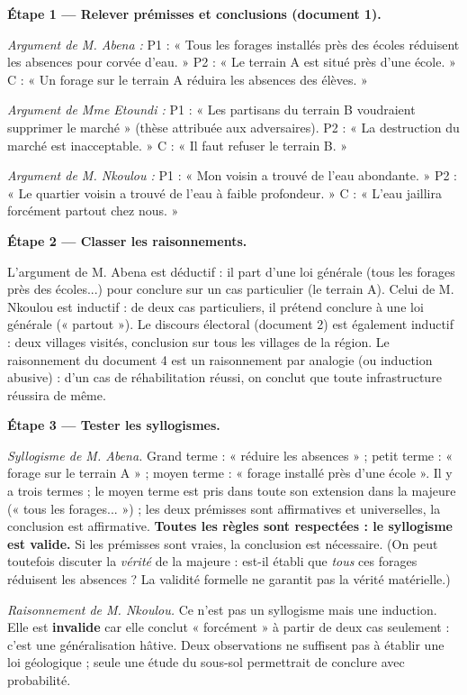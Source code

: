 \documentclass[11pt]{article}
\newcommand{\cle}[1]{{\popxbold\color{popdark}#1}}
\begin{document}
\begin{exoresolu}
\textbf{Étape 1 — Relever prémisses et conclusions (document 1).}

\emph{Argument de M. Abena :} P1 : « Tous les forages installés près des écoles réduisent les absences pour corvée d'eau. » P2 : « Le terrain A est situé près d'une école. » C : « Un forage sur le terrain A réduira les absences des élèves. »

\emph{Argument de Mme Etoundi :} P1 : « Les partisans du terrain B voudraient supprimer le marché » (thèse attribuée aux adversaires). P2 : « La destruction du marché est inacceptable. » C : « Il faut refuser le terrain B. »

\emph{Argument de M. Nkoulou :} P1 : « Mon voisin a trouvé de l'eau abondante. » P2 : « Le quartier voisin a trouvé de l'eau à faible profondeur. » C : « L'eau jaillira forcément partout chez nous. »

\tcblower

\textbf{Étape 2 — Classer les raisonnements.}

L'argument de M. Abena est \cle{déductif} : il part d'une loi générale (tous les forages près des écoles...) pour conclure sur un cas particulier (le terrain A). Celui de M. Nkoulou est \cle{inductif} : de deux cas particuliers, il prétend conclure à une loi générale (« partout »). Le discours électoral (document 2) est également inductif : deux villages visités, conclusion sur tous les villages de la région. Le raisonnement du document 4 est un raisonnement par \cle{analogie} (ou induction abusive) : d'un cas de réhabilitation réussi, on conclut que toute infrastructure réussira de même.

\textbf{Étape 3 — Tester les syllogismes.}

\emph{Syllogisme de M. Abena.} Grand terme : « réduire les absences » ; petit terme : « forage sur le terrain A » ; moyen terme : « forage installé près d'une école ». Il y a trois termes ; le moyen terme est pris dans toute son extension dans la majeure (« tous les forages... ») ; les deux prémisses sont affirmatives et universelles, la conclusion est affirmative. \textbf{Toutes les règles sont respectées : le syllogisme est valide.} Si les prémisses sont vraies, la conclusion est nécessaire. (On peut toutefois discuter la \emph{vérité} de la majeure : est-il établi que \emph{tous} ces forages réduisent les absences ? La validité formelle ne garantit pas la vérité matérielle.)

\emph{Raisonnement de M. Nkoulou.} Ce n'est pas un syllogisme mais une induction. Elle est \textbf{invalide} car elle conclut « forcément » à partir de deux cas seulement : c'est une \cle{généralisation hâtive}. Deux observations ne suffisent pas à établir une loi géologique ; seule une étude du sous-sol permettrait de conclure avec probabilité.


\end{exoresolu}
\end{document}

